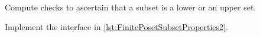 
\begin{codeexercise}
    Compute checks to ascertain that a subset is a lower or an upper set.

    Implement the interface in \cref{lst:FinitePosetSubsetProperties2}.
\end{codeexercise}

